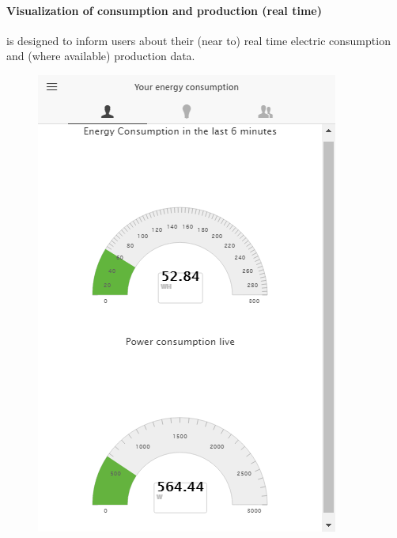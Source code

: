 \paragraph{Visualization of consumption and production (real time)} is designed to inform users about their (near to) real time electric consumption and (where available) production data.
\begin{figure}[htb]
      \begin{center}
        \begin{minipage}[htb]{0.33\linewidth}    
         \includegraphics[width=1\linewidth]{img/visual_consumption.png}  
        \end{minipage}
        \begin{minipage}[htb]{0.33\linewidth}    

\end{minipage}
\end{center}
\end{figure}
